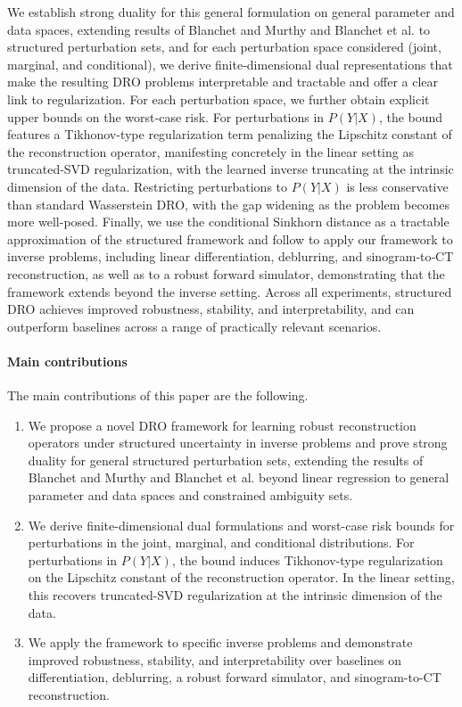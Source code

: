 \documentclass{article}
\theoremstyle{definition}
\theoremstyle{remarksty}
\begin{document}
We establish strong duality for this general formulation on general parameter and data spaces, extending results of Blanchet and Murthy \cite{blanchet_quantifying_2019} and Blanchet et al. \cite{blanchet_robust_2019} to structured perturbation sets, and for each perturbation space considered (joint, marginal, and conditional), we derive finite‑dimensional dual representations that make the resulting DRO problems interpretable and tractable and offer a clear link to regularization. For each perturbation space, we further obtain explicit upper bounds on the worst‑case risk. For perturbations in $P(Y|X)$, the bound features a Tikhonov-type regularization term penalizing the Lipschitz constant of the reconstruction operator, manifesting concretely in the linear setting as truncated-SVD regularization, with the learned inverse truncating at the intrinsic dimension of the data. Restricting perturbations to $P(Y|X)$ is less conservative than standard Wasserstein DRO, with the gap widening as the problem becomes more well-posed. Finally, we use the conditional Sinkhorn distance as a tractable approximation of the structured framework and follow \cite{wang_sinkhorn_2026} to apply our framework to inverse problems, including linear differentiation, deblurring, and sinogram‑to‑CT reconstruction, as well as to a robust forward simulator, demonstrating that the framework extends beyond the inverse setting. Across all experiments, structured DRO achieves improved robustness, stability, and interpretability, and can outperform baselines across a range of practically relevant scenarios.

\paragraph{Main contributions} The main contributions of this paper are the following.
\begin{enumerate}
    \item We propose a novel DRO framework for learning robust reconstruction operators under structured uncertainty in inverse problems and prove strong duality for general structured perturbation sets, extending the results of Blanchet and Murthy \cite{blanchet_quantifying_2019} and Blanchet et al. \cite{blanchet_robust_2019} beyond linear regression to general parameter and data spaces and constrained ambiguity sets.
    \item We derive finite-dimensional dual formulations and worst-case risk bounds for perturbations in the joint, marginal, and conditional distributions. For perturbations in $P(Y|X)$, the bound induces Tikhonov-type regularization on the Lipschitz constant of the reconstruction operator. In the linear setting, this recovers truncated-SVD regularization at the intrinsic dimension of the data.
    \item We apply the framework to specific inverse problems and demonstrate improved robustness, stability, and interpretability over baselines on differentiation, deblurring, a robust forward simulator, and sinogram-to-CT reconstruction.
\end{enumerate}
\end{document}
